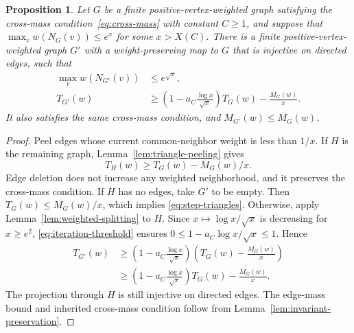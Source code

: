 \documentclass[11pt]{article}
\newtheorem{proposition}[theorem]{Proposition}
\theoremstyle{definition}
\theoremstyle{remark}
\numberwithin{equation}{section}
\begin{document}
\begin{proposition}\label{prop:neighborhood-reduction}
Let $G$ be a finite positive-vertex-weighted graph satisfying the
cross-mass condition~\eqref{eq:cross-mass} with constant $C\ge1$, and suppose that
$\max_vw(N_G(v))\le e^x$ for some $x>X(C)$. There is a finite
positive-vertex-weighted graph $G'$ with a weight-preserving map to
$G$ that is injective on directed edges, such that
\begin{align}
 \max_vw(N_{G'}(v))&\le e^{\sqrt x},\label{eq:step-neighborhood}\\
 T_{G'}(w)&\ge
 \left(1-a_C\frac{\log x}{\sqrt x}\right)T_G(w)
       -\frac{M_G(w)}x.\label{eq:step-triangles}
\end{align}
It also satisfies the same cross-mass condition, and $M_{G'}(w)\le M_G(w)$.
\end{proposition}

\begin{proof}
Peel edges whose current common-neighbor weight is less than $1/x$.
If $H$ is the remaining graph, Lemma~\ref{lem:triangle-peeling} gives
\[
 T_H(w)\ge T_G(w)-M_G(w)/x.
\]
Edge deletion does not increase any weighted neighborhood, and it
preserves the cross-mass condition. If $H$ has no edges, take $G'$ to
be empty. Then $T_G(w)\le M_G(w)/x$, which implies
\eqref{eq:step-triangles}.
Otherwise, apply Lemma~\ref{lem:weighted-splitting} to $H$.
Since $x\mapsto\log x/\sqrt x$ is decreasing for $x\ge e^2$,
\eqref{eq:iteration-threshold} ensures
$0\le1-a_C\log x/\sqrt x\le1$. Hence
\begin{align*}
 T_{G'}(w)
 &\ge\left(1-a_C\frac{\log x}{\sqrt x}\right)
           \left(T_G(w)-\frac{M_G(w)}x\right)\\
 &\ge\left(1-a_C\frac{\log x}{\sqrt x}\right)T_G(w)
           -\frac{M_G(w)}x.
\end{align*}
The projection through $H$ is still injective on directed edges.
The edge-mass bound and inherited cross-mass condition follow from
Lemma~\ref{lem:invariant-preservation}.
\end{proof}
\end{document}
